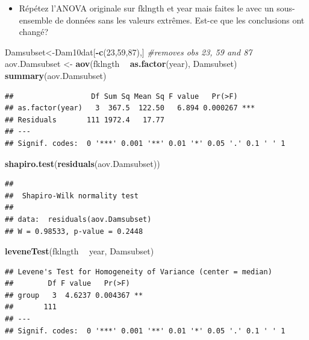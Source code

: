 \documentclass[12pt,]{book}
\newenvironment{Shaded}{\begin{snugshade}}{\end{snugshade}}
\newcommand{\CommentTok}[1]{\textcolor[rgb]{0.37,0.37,0.37}{\textit{#1}}}
\newcommand{\DecValTok}[1]{\textcolor[rgb]{0.06,0.06,0.06}{#1}}
\newcommand{\KeywordTok}[1]{\textcolor[rgb]{0.27,0.27,0.27}{\textbf{#1}}}
\newcommand{\NormalTok}[1]{#1}
\newcommand{\OperatorTok}[1]{\textcolor[rgb]{0.43,0.43,0.43}{\textbf{#1}}}
\newcommand{\StringTok}[1]{\textcolor[rgb]{0.5,0.5,0.5}{#1}}
\providecommand{\tightlist}{%
  \setlength{\itemsep}{0pt}\setlength{\parskip}{0pt}}
\begin{document}
\begin{itemize}
\tightlist
\item
  Répétez l'ANOVA originale sur fklngth et year mais faites le avec un sous-ensemble de données sans les valeurs extrêmes. Est-ce que les conclusions ont changé?
\end{itemize}

\begin{Shaded}
\begin{Highlighting}[]
\NormalTok{Damsubset<-Dam10dat[}\OperatorTok{-}\KeywordTok{c}\NormalTok{(}\DecValTok{23}\NormalTok{,}\DecValTok{59}\NormalTok{,}\DecValTok{87}\NormalTok{),] }\CommentTok{#removes obs 23, 59 and 87}
\NormalTok{aov.Damsubset <-}\StringTok{ }\KeywordTok{aov}\NormalTok{(fklngth }\OperatorTok{~}\StringTok{ }\KeywordTok{as.factor}\NormalTok{(year), Damsubset)}
\KeywordTok{summary}\NormalTok{(aov.Damsubset)}
\end{Highlighting}
\end{Shaded}

\begin{verbatim}
##                  Df Sum Sq Mean Sq F value   Pr(>F)    
## as.factor(year)   3  367.5  122.50   6.894 0.000267 ***
## Residuals       111 1972.4   17.77                     
## ---
## Signif. codes:  0 '***' 0.001 '**' 0.01 '*' 0.05 '.' 0.1 ' ' 1
\end{verbatim}

\begin{Shaded}
\begin{Highlighting}[]
\KeywordTok{shapiro.test}\NormalTok{(}\KeywordTok{residuals}\NormalTok{(aov.Damsubset))}
\end{Highlighting}
\end{Shaded}

\begin{verbatim}
## 
## 	Shapiro-Wilk normality test
## 
## data:  residuals(aov.Damsubset)
## W = 0.98533, p-value = 0.2448
\end{verbatim}

\begin{Shaded}
\begin{Highlighting}[]
\KeywordTok{leveneTest}\NormalTok{(fklngth }\OperatorTok{~}\StringTok{ }\NormalTok{year, Damsubset)}
\end{Highlighting}
\end{Shaded}

\begin{verbatim}
## Levene's Test for Homogeneity of Variance (center = median)
##        Df F value   Pr(>F)   
## group   3  4.6237 0.004367 **
##       111                    
## ---
## Signif. codes:  0 '***' 0.001 '**' 0.01 '*' 0.05 '.' 0.1 ' ' 1
\end{verbatim}
\end{document}
